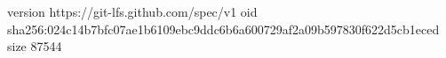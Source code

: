 version https://git-lfs.github.com/spec/v1
oid sha256:024c14b7bfc07ae1b6109ebc9ddc6b6a600729af2a09b597830f622d5cb1eced
size 87544
